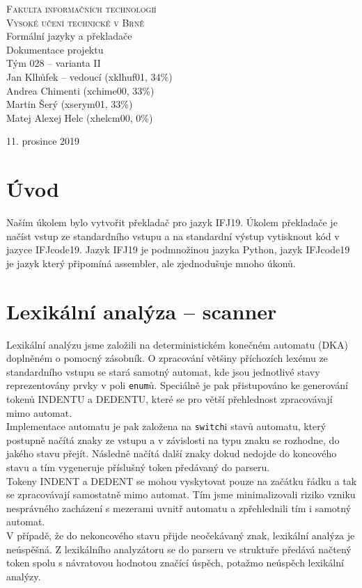 \documentclass[12pt, a4paper]{article}
\begin{document}
\begin{center}
    \thispagestyle{empty}
    \Huge
    \textsc{Fakulta informačních technologií\\Vysoké učení technické v Brně}\\
    \medskip
    \LARGE{Formální jazyky a překladače \\}
    \Large{ Dokumentace projektu \\ Tým 028 -- varianta II \\}
    \bigskip
    \large{Jan Klhůfek -- vedoucí (xklhuf01, 34\%) \\ Andrea Chimenti (xchime00, 33\%) \\ Martin Šerý (xserym01, 33\%) \\ Matej Alexej Helc (xhelcm00, 0\%)}
\end{center}
{\large 11. prosince 2019 \hfill }

\newpage

\section{Úvod}
\justifying
Naším úkolem bylo vytvořit překladač pro jazyk IFJ19. Úkolem překladače je načíst vstup ze standardního vstupu a na standardní výstup vytisknout kód v jazyce IFJcode19. Jazyk IFJ19 je podmnožinou jazyka Python, jazyk IFJcode19 je jazyk který připomíná assembler, ale zjednodušuje mnoho úkonů.

\section{Lexikální analýza -- scanner}
\justifying
Lexikální analýzu jsme založili na deterministickém konečném automatu (DKA) doplněném o pomocný zásobník. O zpracování většiny příchozích lexému ze standardního vstupu se stará samotný automat, kde jsou jednotlivé stavy reprezentovány prvky v poli \texttt{enum}ů. Speciálně je pak přistupováno ke generování tokenů INDENTU a DEDENTU, které se pro větší přehlednost zpracovávají mimo automat.\\
Implementace automatu je pak založena na \texttt{switch}i stavů automatu, který postupně načítá znaky ze vstupu a v závislosti na typu znaku se rozhodne, do jakého stavu přejít. Následně načítá další znaky dokud nedojde do koncového stavu a tím vygeneruje příslušný token předávaný do parseru. \\
Tokeny INDENT a DEDENT se mohou vyskytovat pouze na začátku řádku a tak se zpracovávají samostatně mimo automat. Tím jsme minimalizovali riziko vzniku nesprávného zacházení s mezerami uvnitř automatu a zpřehlednili tím i samotný automat. \\
V případě, že do nekoncového stavu přijde neočekávaný znak, lexikální analýza je neúspěšná. Z lexikálního analyzátoru se do parseru ve struktuře předává načtený token spolu s návratovou hodnotou značící úspěch, potažmo neúspěch lexikální analýzy. \\
\end{document}
